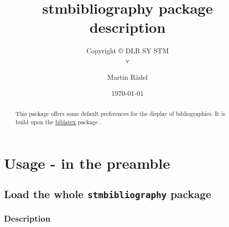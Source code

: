 
\usepackage[T1]{fontenc}
\usepackage[utf8]{inputenc}
\usepackage{enumitem}

\usepackage[%
  style=stmdefault,%
]{stmbibliography}




\author{Martin R\"{a}del}
\title{stmbibliography package description}
\subtitle{Copyright \copyright{} \the\year{} DLR SY STM\\v\formatdate[versiondatestyle]{\DTMToday}}
\date{\today}




\maketitle

\begin{abstract}
This package offers some default preferences for the display of bibliographies. It is build upon the \href{https://ctan.org/pkg/biblatex}{biblatex} package \cite{biblatex314_20191201}.
\end{abstract}

\tableofcontents

\conditionallistoffigures  %
\conditionallistoftables   %
\conditionallistoflistings %

\section{Usage - in the preamble}

\subsection{Load the whole \protect\texttt{stmbibliography} package}
\label{sec:usage:preamble:wholepackage}

\subsubsection{Description}
\label{sec:usage:preamble:wholepackage:description}

